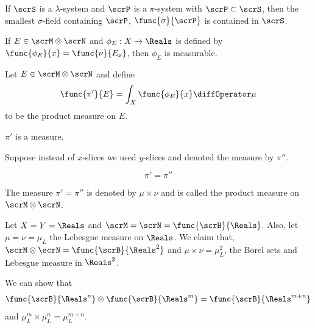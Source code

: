 \begin{theorem}
    If \(\scrS\) is a \(\lambda\)-system and \(\scrP\) is a \(\pi\)-system with \(\scrP \subset \scrS\), then the smallest \(\sigma\)-field containing \(\scrP\), \(\func{\sigma}{\scrP}\) is contained in \(\scrS\).
\end{theorem}

\begin{proposition}
    If \(E \in \scrM \otimes \scrN\) and \(\phi_E : X \to \Reals\) is defined by \(\func{\phi_E}{x} = \func{\nu}{E_x}\), then \(\phi_E\) is measurable.
\end{proposition}

\begin{definition}
    Let \(E \in \scrM \otimes \scrN\) and define 
    \begin{equation*}
        \func{\pi'}{E} = \int_X \func{\phi_E}{x}\diffOperator \mu 
    \end{equation*}
    to be the product measure on \(E\).
\end{definition}

\begin{proposition}
    \(\pi'\) is a measure.
\end{proposition}

Suppose instead of \(x\)-slices we used \(y\)-slices and denoted the measure by \(\pi''\). 
\begin{theorem}
    \begin{equation*}
        \pi' = \pi''
    \end{equation*}
\end{theorem}

\begin{definition}
    The measure \(\pi' = \pi''\) is denoted by \(\mu \times \nu\) and is called the product measure on \(\scrM \otimes \scrN\).
\end{definition}

\begin{example}
    Let \(X = Y = \Reals\) and \(\scrM = \scrN = \func{\scrB}{\Reals}\). Also, let \(\mu = \nu =\mu_L\) the Lebesgue measure on \(\Reals\). We claim that, \(\scrM \otimes \scrN = \func{\scrB}{\Reals^2}\) and \(\mu \times \nu = \mu^2_L\), the Borel sets and Lebesgue measure in \(\Reals^2\).
\end{example}

\begin{example}
    We can show that 
    \begin{equation*}
        \func{\scrB}{\Reals^n} \otimes \func{\scrB}{\Reals^m} = \func{\scrB}{\Reals^{m+n}} 
    \end{equation*} 
    and \(\mu^{m}_L \times \mu^{n}_L = \mu^{m+n}_L\).
\end{example}

